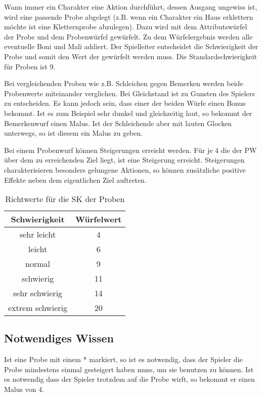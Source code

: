 \documentclass[../../Heldenanleitung2]{subfiles}
\begin{document}
Wann immer ein Charakter eine Aktion durchführt, dessen Ausgang ungewiss ist, wird eine passende Probe abgelegt (z.B. wenn ein Charakter ein Haus erklettern möchte ist eine Kletternprobe abzulegen). Dazu wird mit dem Attributswürfel der Probe und dem Probenwürfel gewürfelt. Zu dem Würfelergebnis werden alle eventuelle Boni und Mali addiert. Der Spielleiter entscheidet die Schwierigkeit der Probe und somit den Wert der gewürfelt werden muss. Die Standardschwierigkeit für Proben ist 9.

Bei vergleichenden Proben wie z.B. Schleichen gegen Bemerken werden beide Probenwerte miteinander verglichen. Bei Gleichstand ist zu Gunsten des Spielers zu entscheiden. Es kann jedoch sein, dass einer der beiden Würfe einen Bonus bekommt. Ist es zum Beispiel sehr dunkel und gleichzeitig laut, so bekommt der Bemerkenwurf einen Malus. Ist der Schleichende aber mit lauten Glocken unterwegs, so ist diesem ein Malus zu geben.

Bei einem Probenwurf können Steigerungen erreicht werden. Für je 4 die der PW über dem zu erreichenden Ziel liegt, ist eine Steigerung erreicht. Steigerungen charakterisieren besonders gelungene Aktionen, so können zusätzliche positive Effekte neben dem eigentlichen Ziel auftreten.

{
\begin{table}[h!]
\caption{Richtwerte für die SK der Proben}
\centering
\begin{tabular}{|c|c|}
\hline
Schwierigkeit & Würfelwert \\
\hline
sehr leicht & 4\\
leicht & 6\\
normal & 9\\
schwierig & 11\\
sehr schwierig & 14\\
extrem schwierig & 20\\ \hline
\end{tabular}
\end{table}
}

\subsection{Notwendiges Wissen}
Ist eine Probe mit einem * markiert, so ist es notwendig, dass der Spieler die Probe mindestens einmal gesteigert haben muss, um sie benutzen zu können. Ist es notwendig dass der Spieler trotzdem auf die Probe wirft, so bekommt er einen Malus von 4.
\end{document}
